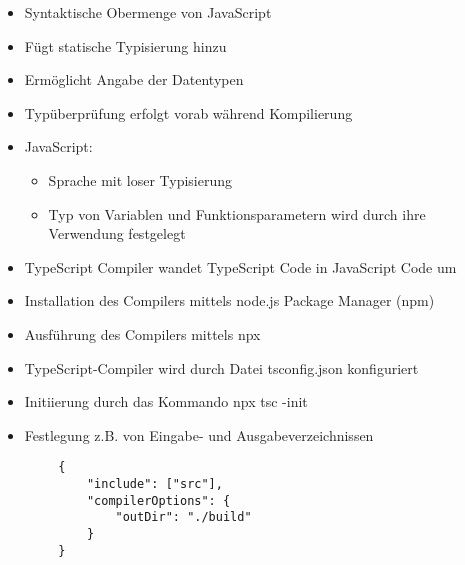 \documentclass[10pt]{article}
\begin{document}
 

\noindent

    \begin{tcolorbox}[
    colback=Red!5!white,
    colframe=Red!75!black,
    title={\centering Allgemeines}]
    \begin{itemize}
        \item Syntaktische Obermenge von JavaScript
        \item Fügt statische Typisierung hinzu
        \item Ermöglicht Angabe der Datentypen
        \item Typüberprüfung erfolgt vorab während Kompilierung
        \item JavaScript:
        \begin{itemize}
            \item Sprache mit loser Typisierung
            \item Typ von Variablen und Funktionsparametern wird durch ihre Verwendung festgelegt
        \end{itemize}
        \item TypeScript Compiler wandet TypeScript Code in JavaScript Code um
        \item Installation des Compilers mittels node.js Package Manager (npm)
        \item Ausführung des Compilers mittels npx
        \item TypeScript-Compiler wird durch Datei tsconfig.json konfiguriert
        \item Initiierung durch das Kommando npx tsc -init
        \item Festlegung z.B. von Eingabe- und Ausgabeverzeichnissen
    \end{itemize}
    \begin{lstlisting}
        {
            "include": ["src"],
            "compilerOptions": {
                "outDir": "./build"
            }
        }
    \end{lstlisting}
    \end{tcolorbox}
\end{document}
